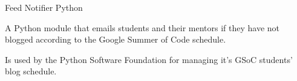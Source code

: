 \begin{projentries}
\projentry%
  {Feed Notifier} %
  {Python} %
  {} %
  {%
    \begin{projitems} %
      \item{A Python module that emails students and their mentors if they
            have not blogged according to the Google Summer of Code schedule.}
      \item{Is used by the Python Software Foundation for managing it's GSoC
            students' blog schedule.}
    \end{projitems}
  }

\end{projentries}
